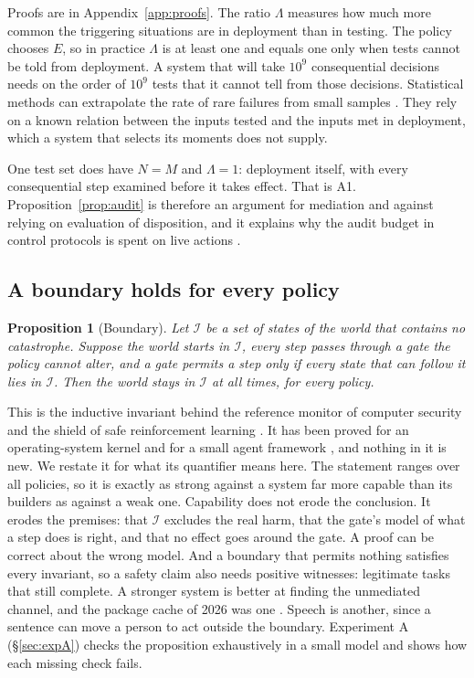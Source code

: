 \documentclass[10pt,twocolumn]{article}
\theoremstyle{plain}
\newtheorem{proposition}{Proposition}
\theoremstyle{definition}
\begin{document}
Proofs are in Appendix~\ref{app:proofs}. The ratio $\Lambda$ measures how much more common
the triggering situations are in deployment than in testing. The policy chooses $E$, so in
practice $\Lambda$ is at least one and equals one only when tests cannot be told from
deployment. A system that will take $10^{9}$ consequential decisions needs on the order of
$10^{9}$ tests that it cannot tell from those decisions. Statistical methods can extrapolate
the rate of rare failures from small samples \cite{jones2025,wu2024}. They rely on a known
relation between the inputs tested and the inputs met in deployment, which a system that
selects its moments does not supply.

One test set does have $N=M$ and $\Lambda=1$: deployment itself, with every consequential
step examined before it takes effect. That is A1. Proposition~\ref{prop:audit} is therefore
an argument for mediation and against relying on evaluation of disposition, and it explains
why the audit budget in control protocols is spent on live actions
\cite{greenblatt2024control}.

\subsection{A boundary holds for every policy}

\begin{proposition}[Boundary]\label{prop:boundary}
Let $\mathcal{I}$ be a set of states of the world that contains no catastrophe. Suppose the
world starts in $\mathcal{I}$, every step passes through a gate the policy cannot alter, and
a gate permits a step only if every state that can follow it lies in $\mathcal{I}$. Then the
world stays in $\mathcal{I}$ at all times, for every policy.
\end{proposition}

This is the inductive invariant behind the reference monitor of computer security
\cite{anderson1972,saltzer1975,schneider2000} and the shield of safe reinforcement learning
\cite{alshiekh2018}. It has been proved for an operating-system kernel \cite{klein2009} and
for a small agent framework \cite{moon2026}, and nothing in it is new. We restate it for what
its quantifier means here. The statement ranges over all policies, so it is exactly as strong
against a system far more capable than its builders as against a weak one. Capability does
not erode the conclusion. It erodes the premises: that $\mathcal{I}$ excludes the real harm,
that the gate's model of what a step does is right, and that no effect goes around the gate.
A proof can be correct about the wrong model. And a boundary that permits nothing satisfies every invariant,
so a safety claim also needs positive witnesses: legitimate tasks that still complete. A stronger system is better at finding the
unmediated channel, and the package cache of 2026 was one \cite{metr2026}. Speech is another,
since a sentence can move a person to act outside the boundary. Experiment A
(\S\ref{sec:expA}) checks the proposition exhaustively in a small model and shows how each
missing check fails.
\end{document}
